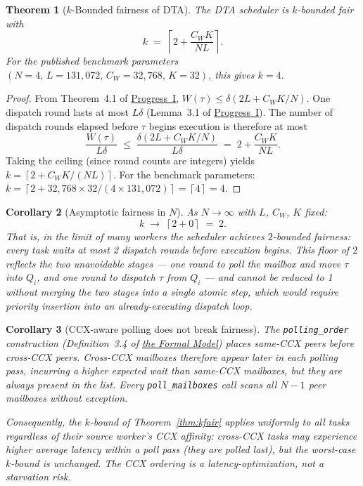 \documentclass[11pt,a4paper]{article}
\newtheorem{theorem}{Theorem}[section]
\newtheorem{corollary}[theorem]{Corollary}
\newcommand{\ceil}[1]{\left\lceil #1 \right\rceil}
\newcommand{\code}[1]{\texttt{#1}}
\begin{document}
\begin{theorem}[$k$-Bounded fairness of DTA]

The DTA scheduler is $k$-bounded fair with
\[
  k \;=\; \ceil{2 + \frac{C_W K}{NL}}.
\]
For the published benchmark parameters $(N=4,\,L=131{,}072,\,
C_W=32{,}768,\,K=32)$, this gives $k = 4$.
\end{theorem}

\begin{proof}
From Theorem~4.1 of \hyperref[chap:bounded_wait]{Progress~I},
$W(\tau) \leq \delta(2L + C_W K/N)$.
One dispatch round lasts at most $L\delta$ (Lemma~3.1 of
\hyperref[chap:bounded_wait]{Progress~I}).
The number of dispatch rounds elapsed before $\tau$ begins
execution is therefore at most
\[
  \frac{W(\tau)}{L\delta}
  \;\leq\;
  \frac{\delta(2L + C_W K/N)}{L\delta}
  \;=\; 2 + \frac{C_W K}{NL}.
\]
Taking the ceiling (since round counts are integers) yields
$k = \ceil{2 + C_W K/(NL)}$.  For the benchmark parameters:
$k = \ceil{2 + 32{,}768 \times 32 / (4 \times 131{,}072)} = \ceil{4} = 4$.
\end{proof}

\begin{corollary}[Asymptotic fairness in $N$]
\label{cor:asymptotic}
As $N \to \infty$ with $L$, $C_W$, $K$ fixed:
\[
  k \;\to\; \ceil{2 + 0} \;=\; 2.
\]
That is, in the limit of many workers the scheduler achieves
$2$-bounded fairness: every task waits at most 2 dispatch rounds
before execution begins.  This floor of $2$ reflects the two
unavoidable stages --- one round to poll the mailbox and move $\tau$
into $Q_i$, and one round to dispatch $\tau$ from $Q_i$ --- and
cannot be reduced to 1 without merging the two stages into a single
atomic step, which would require priority insertion into an
already-executing dispatch loop.
\end{corollary}

\begin{corollary}[CCX-aware polling does not break fairness]
\label{cor:ccx}
The \code{polling\_order} construction (Definition~3.4 of
\hyperref[chap:formal_model]{the Formal Model}) places same-CCX peers before
cross-CCX peers.  Cross-CCX mailboxes therefore appear later
in each polling pass, incurring a higher \emph{expected} wait
than same-CCX mailboxes, but they are \emph{always present} in
the list.  Every \code{poll\_mailboxes} call scans all $N-1$
peer mailboxes without exception.

Consequently, the $k$-bound of Theorem~\ref{thm:kfair} applies
uniformly to all tasks regardless of their source worker's CCX
affinity: cross-CCX tasks may experience higher \emph{average}
latency within a poll pass (they are polled last), but the
worst-case $k$-bound is unchanged.  The CCX ordering is a
\emph{latency-optimization}, not a \emph{starvation risk}.
\end{corollary}
\end{document}
